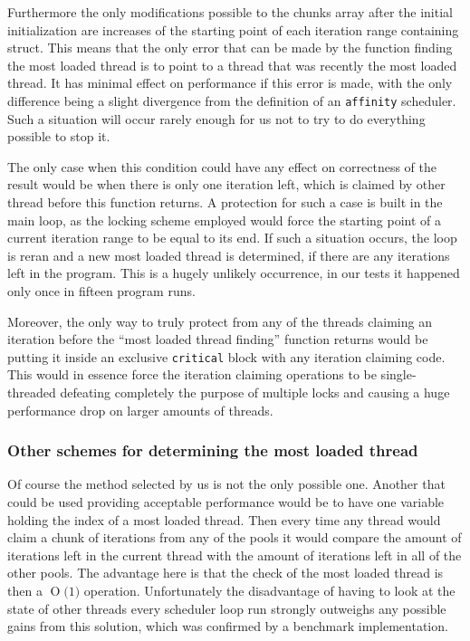 \documentclass[11pt,a4paper]{article}
\newcommand{\BigO}[1]{\ensuremath{\operatorname{O}\bigl(#1\bigr)}}
\begin{document}
Furthermore the only modifications possible to the chunks array after the initial initialization are increases of the starting point of each iteration range containing struct. 
This means that the only error that can be made by the function finding the most loaded thread is to point to a thread that was recently the most loaded thread. 
It has minimal effect on performance if this error is made, with the only difference being a slight divergence from the definition of an \texttt{affinity} scheduler.
Such a situation will occur rarely enough for us not to try to do everything possible to stop it.

The only case when this condition could have any effect on correctness of the result would be when there is only one iteration left, which is claimed by other thread before this function returns.
A protection for such a case is built in the main loop, as the locking scheme employed would force the starting point of a current iteration range to be equal to its end. 
If such a situation occurs, the loop is reran and a new most loaded thread is determined, if there are any iterations left in the program.
This is a hugely unlikely occurrence, in our tests it happened only once in fifteen program runs.

Moreover, the only way to truly protect from any of the threads claiming an iteration before the ``most loaded thread finding'' function returns would be putting it inside an exclusive \texttt{critical} block with any iteration claiming code.
This would in essence force the iteration claiming operations to be single-threaded defeating completely the purpose of multiple locks and causing a huge performance drop on larger amounts of threads.

\subsubsection{Other schemes for determining the most loaded thread}
Of course the method selected by us is not the only possible one. 
Another that could be used providing acceptable performance would be to have one variable holding the index of a most loaded thread.
Then every time any thread would claim a chunk of iterations from any of the pools it would compare the amount of iterations left in the current thread with the amount of iterations left in all of the other pools.
The advantage here is that the check of the most loaded thread is then a \BigO{1} operation.
Unfortunately the disadvantage of having to look at the state of other threads every scheduler loop run strongly outweighs any possible gains from this solution, which was confirmed by a benchmark implementation.
\end{document}
